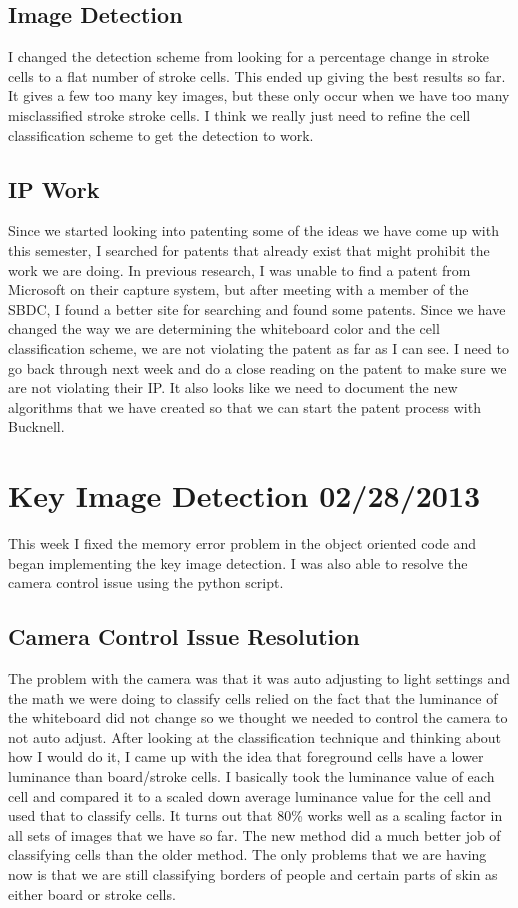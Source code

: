 \documentclass[]{article}
\begin{document}
		\subsection{Image Detection}
			I changed the detection scheme from looking for a percentage change in stroke cells to a flat number of stroke cells. This ended up giving the best results so far. It gives a few too many key images, but these only occur when we have too many misclassified stroke stroke cells. I think we really just need to refine the cell classification scheme to get the detection to work. 
			
		\subsection{IP Work}
			Since we started looking into patenting some of the ideas we have come up with this semester, I searched for patents that already exist that might prohibit the work we are doing. In previous research, I was unable to find a patent from Microsoft on their capture system, but after meeting with a member of the SBDC, I found a better site for searching and found some patents. Since we have changed the way we are determining the whiteboard color and the cell classification scheme, we are not violating the patent as far as I can see. I need to go back through next week and do a close reading on the patent to make sure we are not violating their IP. It also looks like we need to document the new algorithms that we have created so that we can start the patent process with Bucknell. 
	
	\section{Key Image Detection 02/28/2013}
		This week I fixed the memory error problem in the object oriented code and began implementing the key image detection. I was also able to resolve the camera control issue using the python script.
		
		\subsection{Camera Control Issue Resolution}
			The problem with the camera was that it was auto adjusting to light settings and the math we were doing to classify cells relied on the fact that the luminance of the whiteboard did not change so we thought we needed to control the camera to not auto adjust. After looking at the classification technique and thinking about how I would do it, I came up with the idea that foreground cells have a lower luminance than board/stroke cells. I basically took the luminance value of each cell and compared it to a scaled down average luminance value for the cell and used that to classify cells. It turns out that 80\% works well as a scaling factor in all sets of images that we have so far. The new method did a much better job of classifying cells than the older method. The only problems that we are having now is that we are still classifying borders of people and certain parts of skin as either board or stroke cells.
			
\end{document}
